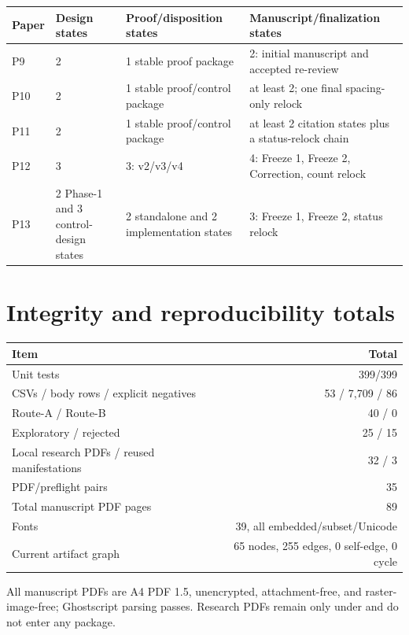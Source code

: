 \documentclass[11pt,a4paper]{article}
\newcommand{\code}[1]{\texttt{\detokenize{#1}}}
\begin{document}
\begin{table}[htbp]
\centering\small
\begin{tabularx}{\textwidth}{@{}lYYY@{}}
\toprule
Paper & Design states & Proof/disposition states & Manuscript/finalization states\\
\midrule
P9 & 2 & 1 stable proof package & 2: initial manuscript and accepted re-review\\
P10 & 2 & 1 stable proof/control package & at least 2; one final spacing-only relock\\
P11 & 2 & 1 stable proof/control package & at least 2 citation states plus a status-relock chain\\
P12 & 3 & 3: v2/v3/v4 & 4: Freeze 1, Freeze 2, Correction, count relock\\
P13 & 2 Phase-1 and 3 control-design states & 2 standalone and 2 implementation states & 3: Freeze 1, Freeze 2, status relock\\
\bottomrule
\end{tabularx}
\end{table}

\section{Integrity and reproducibility totals}

\begin{table}[htbp]
\centering
\begin{tabular}{@{}lr@{}}
\toprule
Item & Total\\
\midrule
Unit tests & 399/399\\
CSVs / body rows / explicit negatives & 53 / 7,709 / 86\\
Route-A / Route-B & 40 / 0\\
Exploratory / rejected & 25 / 15\\
Local research PDFs / reused manifestations & 32 / 3\\
PDF/preflight pairs & 35\\
Total manuscript PDF pages & 89\\
Fonts & 39, all embedded/subset/Unicode\\
Current artifact graph & 65 nodes, 255 edges, 0 self-edge, 0 cycle\\
\bottomrule
\end{tabular}
\end{table}

All manuscript PDFs are A4 PDF 1.5, unencrypted, attachment-free, and
raster-image-free; Ghostscript parsing passes. Research PDFs remain only under
\code{notes/sources/} and do not enter any \code{paper/} package.
\end{document}
